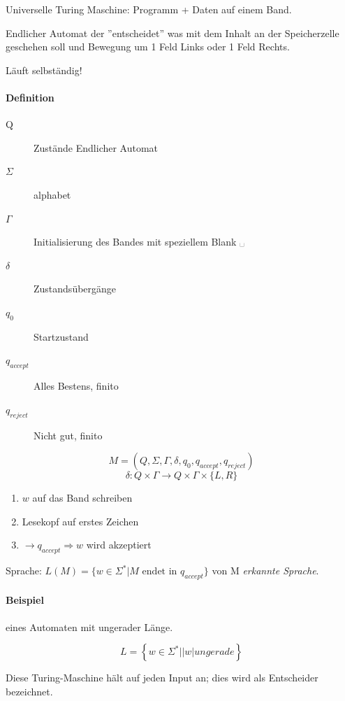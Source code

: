 Universelle Turing Maschine: Programm + Daten auf einem Band.

Endlicher Automat der ''entscheidet'' was mit dem Inhalt an der Speicherzelle geschehen soll und Bewegung um 1 Feld Links oder 1 Feld Rechts.


Läuft selbständig!

\paragraph{Definition}
\begin{description}
	\item[Q] Zustände Endlicher Automat
	\item[$\Sigma$]alphabet
	\item [$\Gamma$] Initialisierung des Bandes mit speziellem Blank ␣
	\item[$\delta$] Zustandsübergänge
	\item[$q_0$] Startzustand
	\item[$q_{accept}$] Alles Bestens, finito
	\item[$q_{reject}$] Nicht gut, finito
\end{description}

\[
	M=(Q, \Sigma, \Gamma, \delta, q_0, q_{accept}, q_{reject})
\]
\[
	\delta: Q \times \Gamma \rightarrow Q \times \Gamma \times \{L, R\}
\]


\begin{enumerate}
	\item $w$ auf das Band schreiben
	\item Lesekopf auf erstes Zeichen
	\item $\rightarrow q_{accept} \Rightarrow w$ wird akzeptiert
\end{enumerate}

Sprache: $L(M) = \{w \in \Sigma^\ast | M \text{ endet in } q_{accept} \}$
von M \emph{erkannte Sprache}.

\paragraph{Beispiel} eines Automaten mit ungerader Länge.

\[
	L = \left\{w \in \Sigma^\ast \left| \left|w\right| ungerade \right.\right\}
\]


Diese Turing-Maschine hält auf jeden Input an; dies wird als Entscheider bezeichnet.

